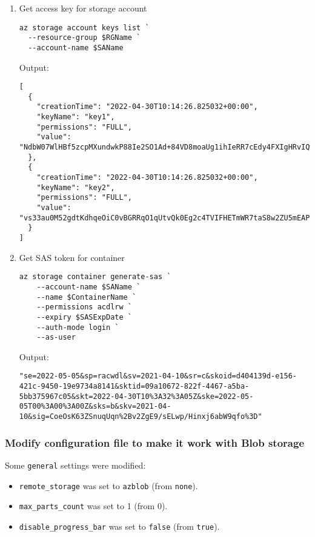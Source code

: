 \begin{enumerate}
\item Get access key for storage account
\label{sec:org9615db0}
\begin{verbatim}
az storage account keys list `
  --resource-group $RGName `
  --account-name $SAName
\end{verbatim}

Output:
\begin{verbatim}
[
  {
    "creationTime": "2022-04-30T10:14:26.825032+00:00",
    "keyName": "key1",
    "permissions": "FULL",
    "value": "NdbW07WlHBf5zcpMXundwkP88Ie2SO1Ad+84VD8moaUg1ihIeRR7cEdy4FXIgHRvIQwPIMc7eD2q+ASt6EqxWg=="
  },
  {
    "creationTime": "2022-04-30T10:14:26.825032+00:00",
    "keyName": "key2",
    "permissions": "FULL",
    "value": "vs33au0M52gdtKdhqeOiC0vBGRRqO1qUtvQk0Eg2c4TVIFHETmWR7taS8w2ZU5mEAPzYS4ySWBXY+AStcBusiQ=="
  }
]
\end{verbatim}

\item Get SAS token for container
\label{sec:org6e529f4}
\begin{verbatim}
az storage container generate-sas `
    --account-name $SAName `
    --name $ContainerName `
    --permissions acdlrw `
    --expiry $SASExpDate `
    --auth-mode login `
    --as-user
\end{verbatim}

Output:
\begin{verbatim}
"se=2022-05-05&sp=racwdl&sv=2021-04-10&sr=c&skoid=d404139d-e156-421c-9450-19e9734a8141&sktid=09a10672-822f-4467-a5ba-5bb375967c05&skt=2022-04-30T10%3A32%3A05Z&ske=2022-05-05T00%3A00%3A00Z&sks=b&skv=2021-04-10&sig=CoeOsK63ZSnuqUqn%2Bv2ZgE9/sELwp/Hinxj6abW9qfo%3D"
\end{verbatim}
\end{enumerate}

\subsubsection{Modify configuration file to make it work with Blob storage}
\label{sec:org513a57f}
Some \texttt{general} settings were modified:
\begin{itemize}
\item \texttt{remote\_storage} was set to \texttt{azblob} (from \texttt{none}).
\item \texttt{max\_parts\_count} was set to 1 (from 0).
\item \texttt{disable\_progress\_bar} was set to \texttt{false} (from \texttt{true}).
\end{itemize}

